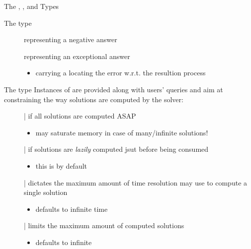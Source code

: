 \documentclass[handout]{beamer}
\begin{document}
\begin{frame}[allowframebreaks]{The , , and  Types}
\begin{block}{The  type}
\begin{description}
            \item[] representing a negative answer

            \item[] representing an exceptional answer
            \begin{itemize}\small
                \item carrying a  locating the error w.r.t. the resultion process
            \end{itemize}
        \end{description}
    \end{block}

    \begin{block}{The  type}
        Instances of  are provided along with users' queries and aim at constraining the way solutions are computed by the solver:
        \begin{description}
            \item[] | if  all solutions are computed ASAP
            \begin{itemize}\small
                \item may saturate memory in case of many/infinite solutions!
            \end{itemize}

            \item[] | if  solutions are \emph{lazily} computed jsut before being consumed
            \begin{itemize}\small
                \item this is  by default
            \end{itemize}

            \item[] | dictates the \alert{maximum} amount of time resolution may use to compute a single solution
            \begin{itemize}\small
                \item defaults to infinite time
            \end{itemize}

            \item[] | limits the \alert{maximum} amount of computed solutions
            \begin{itemize}\small
                \item defaults to infinite
            \end{itemize}
        \end{description}
    \end{block}


\end{frame}
\end{document}
